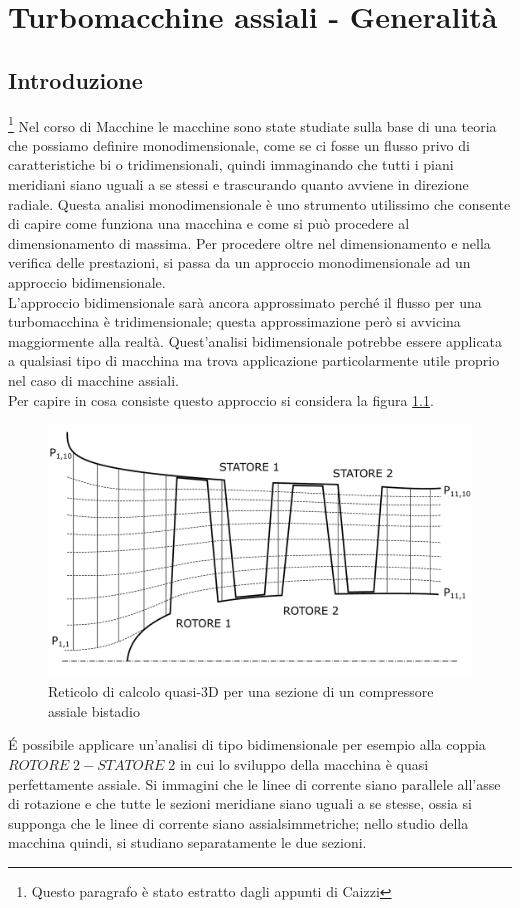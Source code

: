 \chapter{Turbomacchine assiali - Generalità}

\section{Introduzione}
\footnote{Questo paragrafo è stato estratto dagli appunti di Caizzi} Nel corso di Macchine le macchine sono state studiate sulla base di una teoria che possiamo definire monodimensionale, come se ci fosse un flusso privo di caratteristiche bi o tridimensionali, quindi immaginando che tutti i piani meridiani siano uguali a se stessi e trascurando quanto avviene in direzione radiale. Questa analisi monodimensionale è uno strumento utilissimo che consente di capire come funziona una macchina e come si può procedere al dimensionamento di massima. Per procedere oltre nel dimensionamento e nella verifica delle prestazioni, si passa da un approccio monodimensionale ad un approccio bidimensionale.\\
L’approccio bidimensionale sarà ancora approssimato perché il flusso per una turbomacchina è tridimensionale; questa approssimazione però si avvicina maggiormente alla realtà. Quest'analisi bidimensionale potrebbe essere applicata a qualsiasi tipo di macchina ma trova applicazione particolarmente utile proprio nel caso di macchine assiali.\\
Per capire in cosa consiste questo approccio si considera la figura \ref{fig:ReticoloComp1}.
\begin{figure}
\centering
  \includegraphics[width=.8\textwidth]{fig/ReticoloComp.pdf}
\caption{Reticolo di calcolo quasi-3D per una sezione di un compressore assiale bistadio}
\label{fig:ReticoloComp1}
\end{figure}
\'E possibile applicare un’analisi di tipo bidimensionale per esempio alla coppia $ROTORE\;2 - STATORE\;2$ in cui lo sviluppo della macchina è quasi perfettamente assiale. Si immagini che le linee di corrente siano parallele all'asse di rotazione e che tutte le sezioni meridiane siano uguali a se stesse, ossia si supponga che le linee di corrente siano assialsimmetriche; nello studio della macchina quindi, si studiano separatamente le due sezioni.\\
